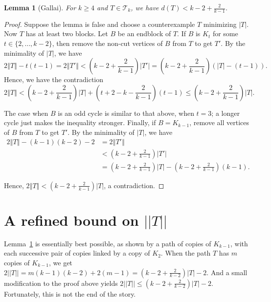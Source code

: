 \documentclass[12pt]{article}
\theoremstyle{plain}
\newtheorem{lem}[thm]{Lemma}
\theoremstyle{definition}
\theoremstyle{remark}
\newcommand{\fancy}[1]{\mathcal{#1}}
\newcommand{\T}{\fancy{T}}
\newcommand{\size}[1]{\left\Vert#1\right\Vert}
\newcommand{\parens}[1]{\left( #1 \right)}
\begin{document}
\begin{lem}[Gallai]
\label{BasicGallaiTreeBound}
	For $k \ge 4$ and $T \in \T_k$, we have $d(T) < k-2 + \frac{2}{k-1}$.
\end{lem}
\begin{proof}
	Suppose the lemma is false and choose a counterexample $T$ minimizing
$|T|$.  Now $T$ has at least two blocks.  Let $B$ be an endblock of $T$.  If $B$
is $K_t$ for some $t\in \{2,\ldots, k-2\}$, then remove the non-cut vertices of
$B$ from $T$ to get $T'$.  By the minimality of $|T|$, we have 
	\[2\size{T} - t(t-1) = 2\size{T'} < \parens{k-2 + \frac{2}{k-1}}|T'| = \parens{k-2 + \frac{2}{k-1}}\parens{|T|-(t-1)}.\]
	Hence, we have the contradiction
	\[2\size{T} < \parens{k-2 + \frac{2}{k-1}}|T| + (t+2 -k - \frac{2}{k-1})(t-1) \le \parens{k-2 + \frac{2}{k-1}}|T|.\]
	
	The case when $B$ is an odd cycle is similar to that above, when $t=3$; a
longer cycle just makes the inequality stronger.  Finally, if $B = K_{k-1}$,
remove all vertices of $B$ from $T$ to get $T'$. By the minimality of $|T|$, we have 
	\begin{align*}
	  2\size{T} - (k-1)(k-2) - 2 &= 2\size{T'}\\
	  &< \parens{k-2 + \frac{2}{k-1}}|T'|\\
	  &= \parens{k-2 + \frac{2}{k-1}}|T| - \parens{k-2 + \frac{2}{k-1}}(k-1).
	\end{align*}

	Hence, $2\size{T} < \parens{k-2 + \frac{2}{k-1}}|T|$, a contradiction.
\end{proof}

\section{A refined bound on \texorpdfstring{$||T||$}{||T||}}
Lemma~\ref{BasicGallaiTreeBound} is essentially best possible, as shown by a
path of copies of $K_{k-1}$, with each successive pair of copies linked by a
copy of $K_2$.  When the path $T$ has $m$ copies of $K_{k-1}$, we get
$2||T||=m(k-1)(k-2)+2(m-1) = (k-2+\frac2{k-2})|T|-2$.  And a small modification
to the proof above yields $2||T|| \le (k-2+\frac2{k-2})|T|-2$. 
Fortunately, this is not the end of the story.
\end{document}
